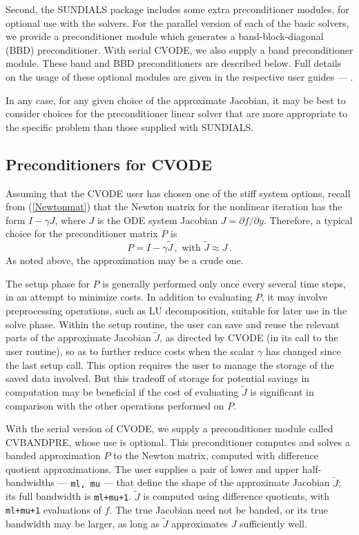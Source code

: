Second, the SUNDIALS package includes some extra preconditioner
modules, for optional use with the solvers.  For the parallel version
of each of the basic solvers, we provide a preconditioner module which
generates a band-block-diagonal (BBD) preconditioner.  With serial
CVODE, we also supply a band preconditioner module.  These band and
BBD preconditioners are described below.  Full details on the usage
of these optional modules are given in the respective user guides
--- \cite{HiSe:03a,TaHi:98,HiTa:99}.

In any case, for any given choice of the approximate Jacobian, it may
be best to consider choices for the preconditioner linear solver that
are more appropriate to the specific problem than those supplied with
SUNDIALS.

\subsection{Preconditioners for CVODE}

Assuming that the CVODE user has chosen one of the stiff system
options, recall from (\ref{Newtonmat}) that the Newton matrix for
the nonlinear iteration has the form $I - \gamma J$, where $J$ is the
ODE system Jacobian $J = \partial f / \partial y$.  Therefore, a
typical choice for the preconditioner matrix $P$ is
\begin{equation*}
  P = I - \gamma \tilde{J} \, , \mbox{ with } \tilde{J} \approx J \, . 
\end{equation*}
As noted above, the approximation may be a crude one.  

The setup phase for $P$ is generally performed only once every several
time steps, in an attempt to minimize costs.  In addition to
evaluating $P$, it may involve preprocessing operations, such as LU
decomposition, suitable for later use in the solve phase.  Within the
setup routine, the user can save and reuse the relevant parts of the
approximate Jacobian $\tilde{J}$, as directed by CVODE (in its call to
the user routine), so as to further reduce costs when the scalar
$\gamma$ has changed since the last setup call.  This option requires the
user to manage the storage of the saved data involved.  But this
tradeoff of storage for potential savings in computation may be
beneficial if the cost of evaluating $\tilde{J}$ is significant in
comparison with the other operations performed on $P$.

With the serial version of CVODE, we supply a preconditioner module
called CVBANDPRE, whose use is optional.  This preconditioner
computes and solves a
banded approximation $P$ to the Newton matrix, computed with
difference quotient approximations.  The user supplies a pair of lower
and upper half-bandwidths --- {\tt ml, mu} --- that define the shape of
the approximate Jacobian $\tilde{J}$; its full bandwidth is
{\tt ml+mu+1}.  $\tilde{J}$ is computed using difference quotients,
with {\tt ml+mu+1} evaluations of $f$.  The true Jacobian need not be
banded, or its true bandwidth may be larger, as long as $\tilde{J}$
approximates $J$ sufficiently well.

